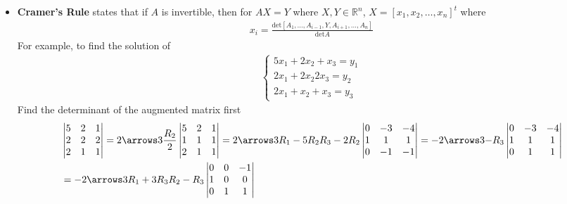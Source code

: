 \begin{itemize}
  \item \textbf{Cramer's Rule} states that if $A$ is invertible, then for $AX = Y$ where $X, Y \in \mathbb{R}^n$, $X = [ x_1, x_2, \ldots, x_n ]^t$ where
    \begin{align*}
      x_i = \frac{\mathrm{det} [ A_1, \ldots, A_{i - 1}, Y, A_{i + 1}, \ldots, A_n ]}{\mathrm{det} A}
    \end{align*}
    For example, to find the solution of
    \begin{align*}
      \begin{cases}
        5x_1 + 2x_2 + x_3 = y_1\\
        2x_1 + 2x_2 2x_3 = y_2\\
        2x_1 + x_2 + x_3 = y_3
      \end{cases}
    \end{align*}
    Find the determinant of the augmented matrix first
    \begin{align*}
      &
      \begin{vmatrix}
        5 & 2 & 1\\
        2 & 2 & 2\\
        2 & 1 & 1
      \end{vmatrix}
      =
      2
      \arrows3{}{\frac{R_2}{2}}{}
      \begin{vmatrix}
        5 & 2 & 1\\
        1 & 1 & 1\\
        2 & 1 & 1
      \end{vmatrix}
      =
      2
      \arrows3{R_1 - 5R_2}{}{R_3 - 2R_2}
      \begin{vmatrix}
        0 & -3 & -4\\
        1 & 1 & 1\\
        0 & -1 & -1
      \end{vmatrix}
      =
      - 2
      \arrows3{}{}{-R_3}
      \begin{vmatrix}
        0 & -3 & -4\\
        1 & 1 & 1\\
        0 & 1 & 1
      \end{vmatrix}
      \\
      &
      =
      -2
      \arrows3{R_1 + 3R_3}{R_2 - R_3}{}
      \begin{vmatrix}
        0 & 0 & -1\\
        1 & 0 & 0\\
        0 & 1 & 1
      \end{vmatrix}

\end{align*}
\end{itemize}
